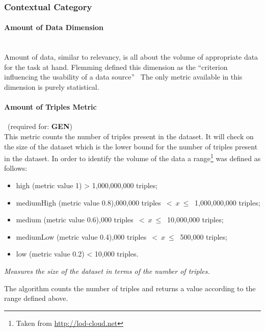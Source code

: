 \subsubsection{Contextual Category}
\label{sec:Contextual} 

\paragraph{Amount of Data Dimension}~\\ %
Amount of data, similar to relevancy, is all about the volume of appropriate data for the task at hand.
Flemming defined this dimension as the ``criterion influencing the usability of a data source''~\cite{Flemming2008}
The only metric available in this dimension is purely statistical.

\paragraph{Amount of Triples Metric}~(required for: \textbf{GEN})~\\ %
This metric counts the number of triples present in the dataset. 
It will check on the size of the dataset which is the lower bound for the number of triples present in the dataset.
In order to identify the volume of the data a range\footnote{Taken from \url{http://lod-cloud.net}} was defined as follows:
\begin{itemize}
\item high (metric value 1)\:  > 1,000,000,000 triples;
\item mediumHigh (metric value 0.8),000,000 triples~$<~x~\leq~$ 1,000,000,000 triples;
\item medium (metric value 0.6),000 triples~$<~x~\leq~$ 10,000,000 triples;
\item mediumLow (metric value 0.4),000 triples~$<~x~\leq~$ 500,000 triples;
\item low (metric value 0.2)\: < 10,000 triples.
\end{itemize}

\begin{mdframed}[style=metricdefinition]
\emph{Measures the size of the dataset in terms of the number of triples.}
\end{mdframed}

The algorithm counts the number of triples and returns a value according to the range defined above.